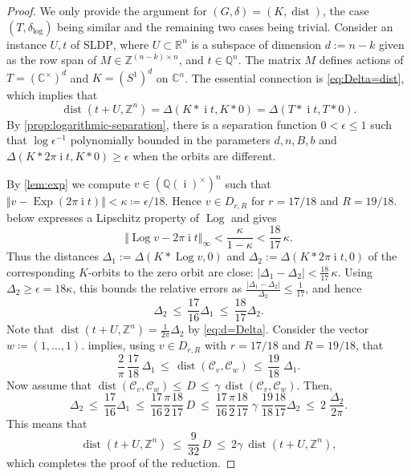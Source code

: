\documentclass[10pt,a4paper]{article}
\theoremstyle{definition}
\DeclareMathOperator{\ii}{i}
\DeclareMathOperator{\Log}{Log}
\DeclareMathOperator{\Exp}{Exp}
\DeclareMathOperator{\dist}{dist}
\newcommand{\distLD}{\delta_{\log}}
\newcommand{\QQ}{\mathbb{Q}}
\newcommand{\CC}{\mathbb{C}}
\newcommand{\ZZ}{\mathbb{Z}}
\newcommand{\RR}{\mathbb{R}}
\newcommand{\KK}{\ensuremath{\mathcal{C}}}
\numberwithin{equation}{section}
\begin{document}
\begin{proof}
We only provide the argument for $(G,\delta)=(K,\dist)$, the case $(T,\distLD)$ being similar
and the remaining two cases being trivial.
Consider an instance $U,t$ of \textsc{SLDP}, where $U\subset\RR^n$ is a subspace
of dimension $d:=n-k$ given as the row span of $M\in\ZZ^{(n-k)\times n}$, and $t\in\QQ^n$.
The matrix $M$ defines actions of $T=(\CC^\times)^d$ and $K=(S^1)^d$ on $\CC^n$.
The essential connection is \cref{eq:Delta=dist},
which implies that
\begin{equation}\label{eq:d=Delta}
  \dist(t+U,\ZZ^n) = \Delta( K\ast \ii t , K\ast 0 ) = \Delta(T\ast \ii t, T\ast 0).
\end{equation}
By \cref{prop:logarithmic-separation},
there is a separation function $0<\epsilon \le 1$ such that
$\log\epsilon^{-1}$ polynomially bounded in the parameters $d,n,B,b$ and
$\Delta(K\ast 2\pi\ii t, K\ast 0)\geq \epsilon$ when the orbits are different.

By \cref{lem:exp} we compute
$v\in(\QQ(\ii)^\times)^n$ such that
$ \Vert v-\Exp(2\pi\ii t)\Vert< \kappa\coloneqq\epsilon/18$.
Hence $v\in D_{r,R}$ for $r=17/18$ and $R=19/18$.
 below expresses a Lipschitz property of $\Log$
and gives
$$
 \Vert \Log v -2\pi\ii t\Vert_\infty < \frac{\kappa}{1-\kappa} < \frac{18}{17}\, \kappa .
$$
Thus the distances
$\Delta_1 := \Delta(K\ast\Log v, 0)$ and
$\Delta_2 :=\Delta(K\ast 2\pi\ii t, 0)$
of the corresponding $K$-orbits to the zero orbit are close:
$|\Delta_1 - \Delta_2| <  \frac{18}{17}\, \kappa$.
Using $\Delta_2 \ge \epsilon = 18\kappa$,
this bounds the relative errors as
$\frac{|\Delta_1 - \Delta_2|}{\Delta_2} \le \frac{1}{17}$,
and hence
$$
 \Delta_2 \ \le\  \frac{17}{16}\Delta_1 \ \le\  \frac{18}{17} \Delta_2 .
$$
Note that
$\dist(t+U,\ZZ^n) = \frac{1}{2\pi} \Delta_2$
by \cref{eq:d=Delta}.
Consider the vector $w\coloneqq (1,\ldots,1)$.
 implies,
using $v\in D_{r,R}$ with $r=17/18$ and $R=19/18$, that
\begin{equation}\label{eq:ineq}
 \frac{2}{\pi}\, \frac{17}{18}\, \Delta_1 \, \leq\,\dist(\KK_v,\KK_w)\, \leq \, \frac{19}{18} \; \Delta_1 .
\end{equation}
Now assume that
$\dist(\KK_v,\KK_w) \leq \, D\, \leq \, \gamma\, \dist(\KK_v,\KK_w)$.
Then, %
$$
 \Delta_2 \ \le\ \frac{17}{16}\Delta_1 \ \le\ \frac{17}{16} \frac{\pi}{2} \frac{18}{17} \, D
  \ \le\
 \frac{17}{16} \frac{\pi}{2} \frac{18}{17}\; \gamma\; \frac{19}{18} \frac{18}{17} \Delta_2
  \ \le\  2\; \frac{\Delta_2}{2\pi} .
$$
This means that
$$
   \dist(t+U,\ZZ^n) \ \le\  \frac{9}{32}\, D \ \le\ 2 \gamma \ \dist(t+U,\ZZ^n) ,
$$
which completes the proof of the reduction.
\end{proof}
\end{document}
